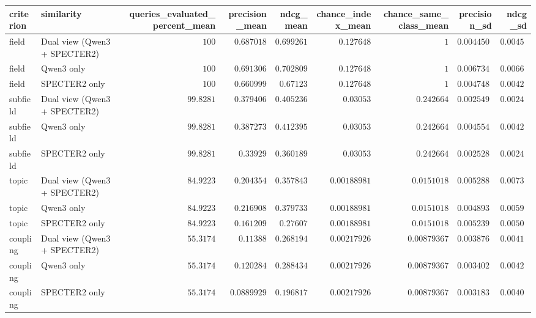 \begin{tabular}{llrrrrrrr}
\toprule
criterion & similarity & queries\_evaluated\_percent\_mean & precision\_mean & ndcg\_mean & chance\_index\_mean & chance\_same\_class\_mean & precision\_sd & ndcg\_sd \\
\midrule
field & Dual view (Qwen3 + SPECTER2) & $100$ & $0.687018$ & $0.699261$ & $0.127648$ & $1$ & $0.00445033$ & $0.0045522$ \\
field & Qwen3 only & $100$ & $0.691306$ & $0.702809$ & $0.127648$ & $1$ & $0.00673411$ & $0.00669635$ \\
field & SPECTER2 only & $100$ & $0.660999$ & $0.67123$ & $0.127648$ & $1$ & $0.0047488$ & $0.00422765$ \\
subfield & Dual view (Qwen3 + SPECTER2) & $99.8281$ & $0.379406$ & $0.405236$ & $0.03053$ & $0.242664$ & $0.00254959$ & $0.00249765$ \\
subfield & Qwen3 only & $99.8281$ & $0.387273$ & $0.412395$ & $0.03053$ & $0.242664$ & $0.00455465$ & $0.00426015$ \\
subfield & SPECTER2 only & $99.8281$ & $0.33929$ & $0.360189$ & $0.03053$ & $0.242664$ & $0.00252801$ & $0.00243548$ \\
topic & Dual view (Qwen3 + SPECTER2) & $84.9223$ & $0.204354$ & $0.357843$ & $0.00188981$ & $0.0151018$ & $0.00528896$ & $0.00730775$ \\
topic & Qwen3 only & $84.9223$ & $0.216908$ & $0.379733$ & $0.00188981$ & $0.0151018$ & $0.00489338$ & $0.00596309$ \\
topic & SPECTER2 only & $84.9223$ & $0.161209$ & $0.27607$ & $0.00188981$ & $0.0151018$ & $0.00523995$ & $0.00509546$ \\
coupling & Dual view (Qwen3 + SPECTER2) & $55.3174$ & $0.11388$ & $0.268194$ & $0.00217926$ & $0.00879367$ & $0.00387662$ & $0.00411337$ \\
coupling & Qwen3 only & $55.3174$ & $0.120284$ & $0.288434$ & $0.00217926$ & $0.00879367$ & $0.00340262$ & $0.0042591$ \\
coupling & SPECTER2 only & $55.3174$ & $0.0889929$ & $0.196817$ & $0.00217926$ & $0.00879367$ & $0.00318357$ & $0.00406722$ \\
\bottomrule
\end{tabular}
